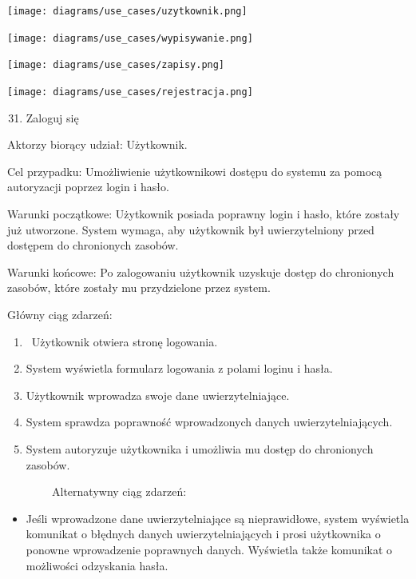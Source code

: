\documentclass[
]{article}
\providecommand{\tightlist}{%
  \setlength{\itemsep}{0pt}\setlength{\parskip}{0pt}}
\begin{document}
{\texttt{[image: diagrams/use\_cases/uzytkownik.png]}}

{\texttt{[image: diagrams/use\_cases/wypisywanie.png]}}

{\texttt{[image: diagrams/use\_cases/zapisy.png]}}

{\texttt{[image: diagrams/use\_cases/rejestracja.png]}}

\begin{enumerate}
\setcounter{enumi}{30}
\tightlist
\item
  {Zaloguj się}
\end{enumerate}

{Aktorzy biorący udział: Użytkownik.}

{Cel przypadku: Umożliwienie użytkownikowi dostępu do systemu za pomocą
autoryzacji poprzez login i hasło.}

{Warunki początkowe: Użytkownik posiada poprawny login i hasło, które
zostały już utworzone. System wymaga, aby użytkownik był uwierzytelniony
przed dostępem do chronionych zasobów.}

{Warunki końcowe: Po zalogowaniu użytkownik uzyskuje dostęp do
chronionych zasobów, które zostały mu przydzielone przez system.}

{Główny ciąg zdarzeń:}

\begin{enumerate}
\tightlist
\item
  {~Użytkownik otwiera stronę logowania.}
\item
  {System wyświetla formularz logowania z polami loginu i hasła.}
\item
  {Użytkownik wprowadza swoje dane uwierzytelniające.}
\item
  {System sprawdza poprawność wprowadzonych danych uwierzytelniających.}
\item
  {System autoryzuje użytkownika i umożliwia mu dostęp do chronionych
  zasobów.}
\end{enumerate}

{~~~~~~~~Alternatywny ciąg zdarzeń:}

\begin{itemize}
\tightlist
\item
  {Jeśli wprowadzone dane uwierzytelniające są nieprawidłowe, system
  wyświetla komunikat o błędnych danych uwierzytelniających i prosi
  użytkownika o ponowne wprowadzenie poprawnych danych. Wyświetla także
  komunikat o możliwości odzyskania hasła.\\
  \strut \\
  }
\end{itemize}
\end{document}
